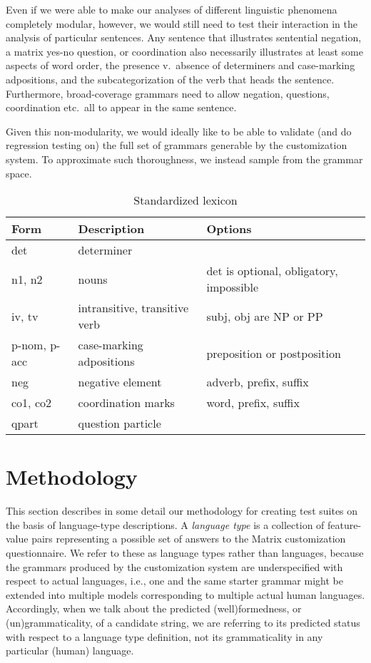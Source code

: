 \documentclass[11pt]{article}
\begin{document}
Even if we were able to make our analyses of different linguistic
phenomena completely modular, however, we would still need to test
their interaction in the analysis of particular sentences.
Any sentence that illustrates sentential negation, a matrix yes-no
question, or coordination also necessarily illustrates at least some
aspects of word order, the presence v.\ absence of determiners and
case-marking adpositions, and the subcategorization of the verb that
heads the sentence.  Furthermore, broad-coverage grammars need to
allow negation, questions, coordination etc.\ all to appear in the
same sentence.

Given this non-modularity, we would ideally like to be able to
validate (and do regression testing on) the full set of grammars
generable by the customization system.  To approximate such
thoroughness, we instead sample from the grammar space.

\begin{table*}[ht]
\small
\begin{center}
\begin{tabular}{l|l|l}
\hline
Form & Description & Options \\ \hline \hline
det & determiner & \\ 
n1, n2 & nouns & det is optional, obligatory, impossible\\
iv, tv & intransitive, transitive verb & subj, obj are NP or PP\\
p-nom, p-acc & case-marking adpositions & preposition or postposition\\
neg & negative element & adverb, prefix, suffix\\
co1, co2 & coordination marks & word, prefix, suffix\\
qpart & question particle & \\
\hline
\end{tabular}
\end{center}
\caption{Standardized lexicon}
\label{tab1}
\end{table*}



\section{Methodology}
\label{arch}

This section describes in some detail our methodology for creating
test suites on the basis of language-type descriptions.  A {\it
language type} is a collection of feature-value pairs representing a
possible set of answers to the Matrix customization questionnaire. We
refer to these as language types rather than languages, because the
grammars produced by the customization system are underspecified with
respect to actual languages, i.e., one and the same starter grammar
might be extended into multiple models corresponding to multiple
actual human languages.  Accordingly, when we talk about the predicted
(well)formedness, or (un)grammaticality, of a candidate string, we are referring to its
predicted status with respect to a language type definition, not its
grammaticality in any particular (human) language.
\end{document}
